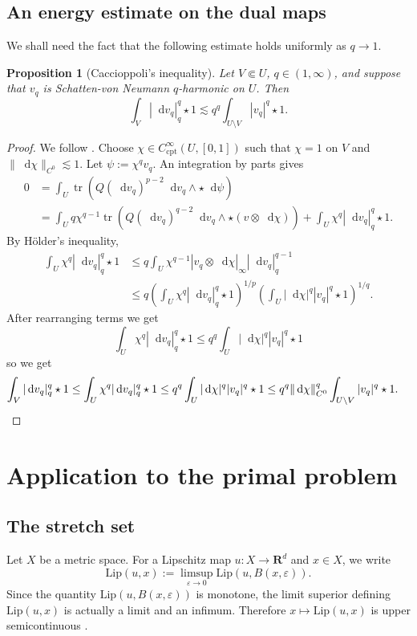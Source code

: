 \documentclass[reqno,11pt]{amsart}
\newcommand{\RR}{\mathbf{R}}
\newcommand*\dif{\mathop{}\!\mathrm{d}}
\DeclareMathOperator{\tr}{tr}
\newcommand{\Lip}{\mathrm{Lip}}
\newcommand{\cpt}{\mathrm{cpt}}
\newtheorem{proposition}[theorem]{Proposition}
\theoremstyle{definition}
\numberwithin{equation}{section}
\begin{document}
\subsection{An energy estimate on the dual maps}
We shall need the fact that the following estimate holds uniformly as $q \to 1$.

\begin{proposition}[Caccioppoli's inequality]\label{Caccioppoli}
Let $V \Subset U$, $q \in (1, \infty)$, and suppose that $v_q$ is Schatten-von Neumann $q$-harmonic on $U$.
Then
$$\int_V |\dif v_q|_{q}^q \star 1 \lesssim q^q \int_{U \setminus V} |v_q|^q \star 1.$$
\end{proposition}
\begin{proof}
We follow \cite[Theorem 11.20]{kinnunen2021maximal}.
Choose $\chi \in C^\infty_\cpt(U, [0, 1])$ such that $\chi = 1$ on $V$ and $\|\dif \chi\|_{C^0} \lesssim 1$.
Let $\psi := \chi^q v_q$.
An integration by parts gives
\begin{align*}
0 &= \int_U \tr(Q(\dif v_q)^{p - 2} \dif v_q \wedge \star \dif \psi) \\
&= \int_U q\chi^{q - 1} \tr(Q(\dif v_q)^{q - 2} \dif v_q \wedge \star (v \otimes \dif \chi)) + \int_U \chi^q |\dif v_q|_{q}^q \star 1.
\end{align*}
By H\"older's inequality,
\begin{align*}
\int_U \chi^q |\dif v_q|_{q}^q \star 1
&\leq q \int_U \chi^{q - 1} |v_q \otimes \dif \chi|_{\infty} |\dif v_q|_{q}^{q - 1} \\
&\leq q \left(\int_U \chi^q |\dif v_q|_{q}^q \star 1\right)^{1/p} \left(\int_U |\dif \chi|^q |v_q|^q \star 1\right)^{1/q}.
\end{align*}
After rearranging terms we get 
$$\int_U \chi^q |\dif v_q|_{q}^q \star 1 \leq q^q \int_U |\dif \chi|^q |v_q|^q \star 1$$
so we get 
\begin{align*}
\int_V |\dif v_q|_{q}^q \star 1 &\leq \int_U \chi^q |\dif v_q|_{q}^q \star 1 \leq q^q \int_U |\dif \chi|^q |v_q|^q \star 1
\leq q^q \|\dif \chi\|_{C^0}^q \int_{U \setminus V} |v_q|^q \star 1. \qedhere 
\end{align*}
\end{proof}

\section{Application to the primal problem}
\subsection{The stretch set}
Let $X$ be a metric space.
For a Lipschitz map $u: X \to \RR^d$ and $x \in X$, we write 
$$\Lip(u, x) := \limsup_{\varepsilon \to 0} \Lip(u, B(x, \varepsilon)).$$
Since the quantity $\Lip(u, B(x, \varepsilon))$ is monotone, the limit superior defining $\Lip(u, x)$ is actually a limit and an infimum.
Therefore $x \mapsto \Lip(u, x)$ is upper semicontinuous \cite[Lemma 4.2]{Crandall2008}.
\end{document}

